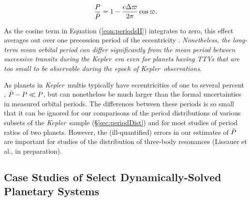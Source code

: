 \documentclass{aastex62}
\newcommand{\ik}{{\it Kepler~}}
\begin{document}

\begin{equation}\label{eqn:periodsII}
\frac{P}{\Bar{P}} = 1 - \frac{e\Delta \varpi}{2\pi}\cos{\varpi}.
\end{equation}

\noindent As the cosine term in Equation (\ref{eqn:periodsII}) integrates to zero, this effect averages out over one precession period of the eccentricity%
. \emph{Nonetheless, the  long-term mean orbital period can differ significantly from the mean period between successive transits during the \ik era even for planets having TTVs that are too small to be observable during the epoch of \ik observations.}  

As planets in \ik multis typically have eccentricities of one to several percent \citep{Xie:2016, Jontof:2016}, $\Bar{P} - P \ll P$, but can nonetheless be much larger than the formal uncertainties in measured orbital periods. The differences between these periods is so small that it can be ignored for our comparisons of the period distributions of various subsets of the \ik sample (\S\ref{sec:periodDist}) and for most studies of period ratios of two planets. However, the (ill-quantified) errors in our estimates of $\Bar{P}$ are important for studies of the distribution of three-body resonances (Lissauer et al., in preparation).    


\subsection{Case Studies of Select Dynamically-Solved Planetary Systems}\label{sec:individual}

\end{document}
